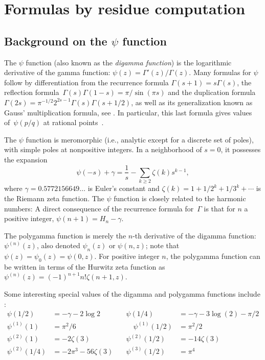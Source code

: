 \documentclass{article}
\theoremstyle{definition}
\begin{document}
\section{Formulas by residue computation}

\subsection{Background on the \texorpdfstring{$\psi$}{psi} function}
The $\psi$ function (also known as the \emph{digamma function}) is the logarithmic derivative of the gamma function:  $\psi(z) = \Gamma'(z)/\Gamma(z)$. Many formulas for $\psi$ follow by differentiation from the recurrence formula $\Gamma(s+1)=s\Gamma(s)$, the reflection formula~$\Gamma(s)\Gamma(1-s)=\pi/\sin(\pi s)$ and the duplication formula $\Gamma(2s)=\pi^{-1/2}2^{2s-1}\Gamma(s)\Gamma (s+1/2)$, as well as its generalization known as Gauss' multiplication formula, see \cite[ch.~5]{dlmf}. In particular, this last formula gives values of~$\psi(p/q)$ at rational points~\cite[5.4.19]{dlmf}.

The $\psi$ function is meromorphic (i.e., analytic except for a discrete set of poles), with simple poles at nonpositive integers. In a neighborhood of $s=0$, it possesses the expansion~\cite[5.5.2 and 5.7.4]{dlmf}
\begin{equation}\label{eq:psi_at_0}
\psi(-s)+\gamma=\frac1s-\sum_{k\ge2}\zeta(k)s^{k-1},
\end{equation}
where $\gamma = 0.5772156649\ldots$ is Euler's constant and $\zeta (k)=1+1/2^k+1/3^k+\dotsb$ is the Riemann zeta function. The $\psi$ function is closely related to the harmonic numbers: A direct consequence of the recurrence formula for~$\Gamma$ is that for $n$ a positive integer, $\psi(n+1)=H_n - \gamma$.

The polygamma function is merely the $n$-th derivative of the digamma function: $\psi^{(n)} (z)$, also denoted $\psi_n(z)$ or $\psi(n,z)$; note that $\psi(z) = \psi_0(z) = \psi(0,z)$. For positive integer $n$, the polygamma function can be written in terms of the Hurwitz zeta function as $\psi^{(n)}(z) = (-1)^{n+1} n! \zeta (n+1, z)$.

Some interesting special values of the digamma and polygamma functions include \cite{Choi2007}:
\begin{align}
\psi(1/2) &= - \gamma - 2 \log 2 \quad &  \psi(1/4) &= -\gamma - 3\log (2) - \pi/2  \nonumber \\
\psi^{(1)}(1) &= \pi^2 / 6 & \quad \psi^{(1)}(1/2) &= \pi^2/2 \nonumber \\
\psi^{(2)}(1) &= -2 \zeta(3) \quad & \psi^{(2)}(1/2) &= -14 \zeta(3) \nonumber \\
\psi^{(2)}(1/4) &= -2 \pi^3 - 56 \zeta(3) \quad & \psi^{(3)}(1/2) &= \pi^4
\end{align}
\end{document}
